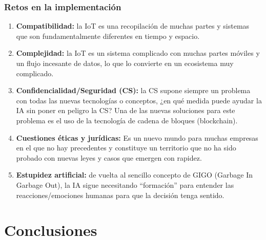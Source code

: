 \documentclass[12pt]{article}
\begin{document}
  \subsubsection*{Retos en la implementación}
  \begin{enumerate}
    \item \textbf{Compatibilidad:} la IoT es una recopilación de muchas partes y sistemas que son fundamentalmente diferentes en tiempo y espacio.
    \item \textbf{Complejidad:} la IoT es un sistema complicado con muchas partes móviles y un flujo incesante de datos, lo que lo convierte en un ecosistema muy complicado.
    \item \textbf{Confidencialidad/Seguridad (CS):} la CS supone siempre un problema con todas las nuevas tecnologías o conceptos, ¿en qué medida puede ayudar la IA sin poner en peligro la CS? Una de las nuevas soluciones para este problema es el uso de la tecnología de cadena de bloques (blockchain).
    \item \textbf{Cuestiones éticas y jurídicas:} Es un nuevo mundo para muchas empresas en el que no hay precedentes y constituye un territorio que no ha sido probado con nuevas leyes y casos que emergen con rapidez.
    \item \textbf{Estupidez artificial:} de vuelta al sencillo concepto de GIGO (Garbage In Garbage Out), la IA sigue necesitando ``formación'' para entender las reacciones/emociones humanas para que la decisión tenga sentido.
  \end{enumerate}

  \section*{Conclusiones}

  
\end{document}
